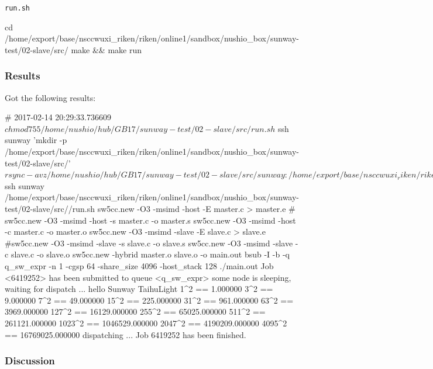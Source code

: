 \verb`run.sh`
\begin{code}

cd /home/export/base/nsccwuxi_riken/riken/online1/sandbox/nushio_box/sunway-test/02-slave/src/
make && make run
    
\end{code}

\subsubsection{Results}

Got the following results:

\begin{code}
# 2017-02-14 20:29:33.736609
$ chmod 755 /home/nushio/hub/GB17/sunway-test/02-slave/src/run.sh
$ ssh sunway 'mkdir -p /home/export/base/nsccwuxi_riken/riken/online1/sandbox/nushio_box/sunway-test/02-slave/src/'
$ rsync -avz /home/nushio/hub/GB17/sunway-test/02-slave/src/ sunway:/home/export/base/nsccwuxi_riken/riken/online1/sandbox/nushio_box/sunway-test/02-slave/src/
sending incremental file list
./
Makefile
master.c
run.sh
slave.c

sent 1,298 bytes  received 98 bytes  146.95 bytes/sec
total size is 1,995  speedup is 1.43
$ ssh sunway /home/export/base/nsccwuxi_riken/riken/online1/sandbox/nushio_box/sunway-test/02-slave/src//run.sh
sw5cc.new -O3 -msimd -host -E master.c > master.e
#	sw5cc.new -O3 -msimd -host -s master.c -o master.s
sw5cc.new -O3 -msimd -host -c master.c -o master.o
sw5cc.new -O3 -msimd -slave -E slave.c > slave.e
#sw5cc.new -O3 -msimd -slave -s slave.c -o slave.s
sw5cc.new -O3 -msimd -slave -c slave.c -o slave.o
sw5cc.new -hybrid  master.o slave.o -o main.out
bsub -I -b -q q_sw_expr -n 1 -cgsp 64 -share_size 4096 -host_stack 128 ./main.out
Job <6419252> has been submitted to queue <q_sw_expr>
some node is sleeping, waiting for dispatch ...
hello Sunway TaihuLight
1^2 == 1.000000
3^2 == 9.000000
7^2 == 49.000000
15^2 == 225.000000
31^2 == 961.000000
63^2 == 3969.000000
127^2 == 16129.000000
255^2 == 65025.000000
511^2 == 261121.000000
1023^2 == 1046529.000000
2047^2 == 4190209.000000
4095^2 == 16769025.000000
dispatching ...
Job 6419252 has been finished.

\end{code}

\subsubsection{Discussion}

